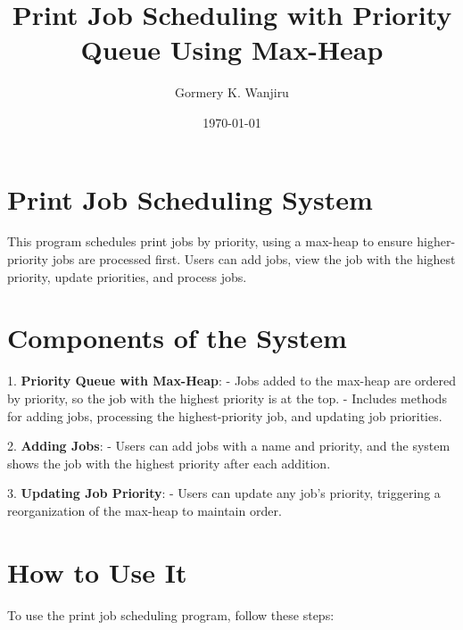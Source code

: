 \documentclass{article}
\title{Print Job Scheduling with Priority Queue Using Max-Heap}
\author{Gormery K. Wanjiru}
\date{\today}
\begin{document}
\maketitle

\section*{Print Job Scheduling System}

This program schedules print jobs by priority, using a max-heap to ensure higher-priority jobs are processed first. Users can add jobs, view the job with the highest priority, update priorities, and process jobs.


\section*{Components of the System}

1. \textbf{Priority Queue with Max-Heap}:
   - Jobs added to the max-heap are ordered by priority, so the job with the highest priority is at the top.
   - Includes methods for adding jobs, processing the highest-priority job, and updating job priorities.

2. \textbf{Adding Jobs}:
   - Users can add jobs with a name and priority, and the system shows the job with the highest priority after each addition.

3. \textbf{Updating Job Priority}:
   - Users can update any job’s priority, triggering a reorganization of the max-heap to maintain order.

   \section*{How to Use It}

   To use the print job scheduling program, follow these steps:
   
\end{document}

